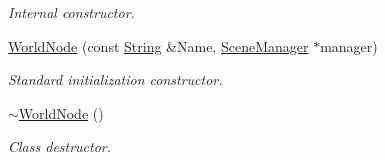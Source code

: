 \begin{DoxyCompactItemize}
\begin{DoxyCompactList}\small\item\em Internal constructor. \item\end{DoxyCompactList}\item 
\hyperlink{classphys_1_1WorldNode_a02ab92f8a5f9da35926ef133a11a441e}{WorldNode} (const \hyperlink{namespacephys_aa03900411993de7fbfec4789bc1d392e}{String} \&Name, \hyperlink{classphys_1_1SceneManager}{SceneManager} $\ast$manager)
\begin{DoxyCompactList}\small\item\em Standard initialization constructor. \item\end{DoxyCompactList}\item 
\hypertarget{classphys_1_1WorldNode_a357c18b6e04a9ae0d0855841a3c774b2}{
\hyperlink{classphys_1_1WorldNode_a357c18b6e04a9ae0d0855841a3c774b2}{$\sim$WorldNode} ()}
\label{classphys_1_1WorldNode_a357c18b6e04a9ae0d0855841a3c774b2}

\begin{DoxyCompactList}\small\item\em Class destructor. \item\end{DoxyCompactList}\end{DoxyCompactItemize}
